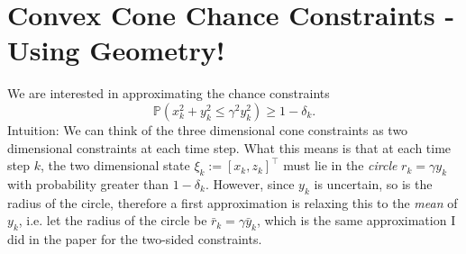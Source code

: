 \documentclass[12pt]{article}
\begin{document}
	
\section*{Convex Cone Chance Constraints - Using Geometry!}
We are interested in approximating the chance constraints
\begin{equation}
\mathbb{P}(x_k^2 + y_k^2 \leq \gamma^2 y_k^2) \geq 1 - \delta_k.
\end{equation}
Intuition: We can think of the three dimensional cone constraints as two dimensional constraints at each time step. 
What this means is that at each time step $k$, the two dimensional state $\xi_k := [x_k, z_k]^\intercal$ must lie in the \textit{circle} $r_k = \gamma y_k$ with probability greater than $1 - \delta_k$. 
However, since $y_k$ is uncertain, so is the radius of the circle, therefore a first approximation is relaxing this to the \textit{mean} of $y_k$, i.e. let the radius of the circle be $\bar{r}_k = \gamma \bar{y}_k$, which is the same approximation I did in the paper for the two-sided constraints.
\end{document}
